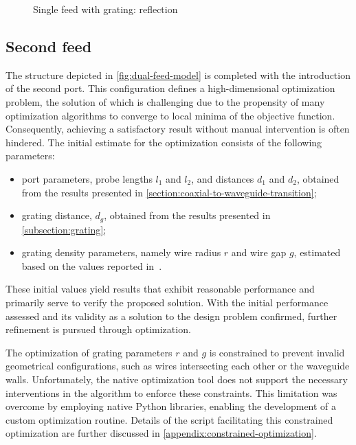 \documentclass[11pt,a4paper,twoside,openany]{report}
\begin{document}
\begin{figure}[!ht]
    \centering
    
    \caption{\label{fig:single-feed-with-grating-reflection}Single feed with grating: reflection}
\end{figure}

\subsection{Second feed}
\label{subsection:dual-feed-optimization}
The structure depicted in \cref{fig:dual-feed-model} is completed with the introduction of the second port. This configuration defines a high-dimensional optimization problem, the solution of which is challenging due to the propensity of many optimization algorithms to converge to local minima of the objective function. Consequently, achieving a satisfactory result without manual intervention is often hindered. The initial estimate for the optimization consists of the following parameters:
\begin{itemize}
    \item port parameters, probe lengths $l_1$ and $l_2$, and distances $d_1$ and $d_2$, obtained from the results presented in \cref{section:coaxial-to-waveguide-transition};
    \item grating distance, $d_g$, obtained from the results presented in \cref{subsection:grating};
    \item grating density parameters, namely wire radius $r$ and wire gap $g$, estimated based on the values reported in~\parencite{karki-et-al:dual-polarized-probe-for-planar-near-field-measurement}.
\end{itemize}
These initial values yield results that exhibit reasonable performance and primarily serve to verify the proposed solution. With the initial performance assessed and its validity as a solution to the design problem confirmed, further refinement is pursued through optimization.

The optimization of grating parameters $r$ and $g$ is constrained to prevent invalid geometrical configurations, such as wires intersecting each other or the waveguide walls. Unfortunately, the native optimization tool does not support the necessary interventions in the algorithm to enforce these constraints. This limitation was overcome by employing native Python libraries, enabling the development of a custom optimization routine. Details of the script facilitating this constrained optimization are further discussed in \cref{appendix:constrained-optimization}.
\end{document}
